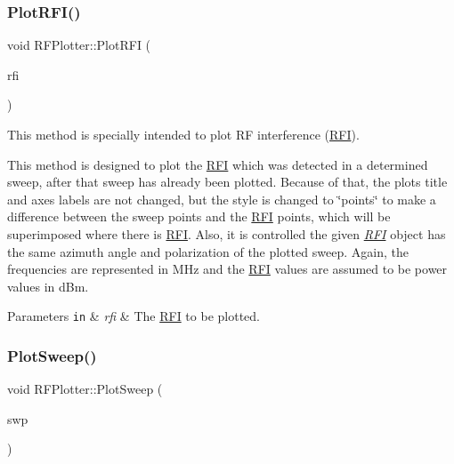 \subsubsection{\texorpdfstring{Plot\+R\+F\+I()}{PlotRFI()}}
{\footnotesize\ttfamily void R\+F\+Plotter\+::\+Plot\+R\+FI (\begin{DoxyParamCaption}\item[{const \hyperlink{structRFI}{R\+FI} \&}]{rfi }\end{DoxyParamCaption})\hspace{0.3cm}{\ttfamily [inline]}}



This method is specially intended to plot RF interference (\hyperlink{structRFI}{R\+FI}). 

This method is designed to plot the \hyperlink{structRFI}{R\+FI} which was detected in a determined sweep, after that sweep has already been plotted. Because of that, the plot\textquotesingle{}s title and axes labels are not changed, but the style is changed to \char`\"{}points\char`\"{} to make a difference between the sweep points and the \hyperlink{structRFI}{R\+FI} points, which will be superimposed where there is \hyperlink{structRFI}{R\+FI}. Also, it is controlled the given {\itshape \hyperlink{structRFI}{R\+FI}} object has the same azimuth angle and polarization of the plotted sweep. Again, the frequencies are represented in M\+Hz and the \hyperlink{structRFI}{R\+FI} values are assumed to be power values in d\+Bm. 
\begin{DoxyParams}[1]{Parameters}
\mbox{\tt in}  & {\em rfi} & The \hyperlink{structRFI}{R\+FI} to be plotted. \\
\hline
\end{DoxyParams}
\mbox{\label{classRFPlotter_a0e70ff9d46ed3edef45529f97753490f}} 
\subsubsection{\texorpdfstring{Plot\+Sweep()}{PlotSweep()}}
{\footnotesize\ttfamily void R\+F\+Plotter\+::\+Plot\+Sweep (\begin{DoxyParamCaption}\item[{const \hyperlink{structSweep}{Sweep} \&}]{swp }\end{DoxyParamCaption})\hspace{0.3cm}{\ttfamily [inline]}}




